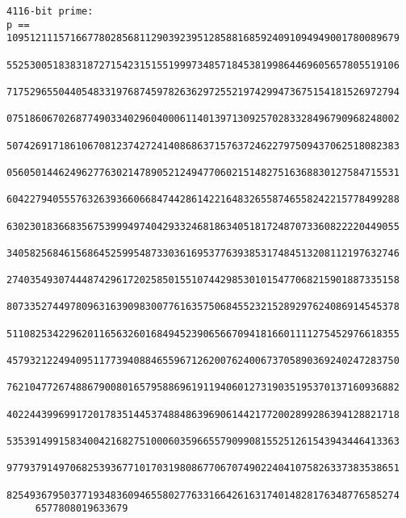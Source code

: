 \documentclass[]{article}
\begin{document}
\begin{small}
\begin{verbatim}
4116-bit prime:
p == 10951211157166778028568112903923951285881685924091094949001780089679
     55253005183831872715423151551999734857184538199864469605657805519106
     71752965504405483319768745978263629725521974299473675154181526972794
     07518606702687749033402960400061140139713092570283328496790968248002
     50742691718610670812374272414086863715763724622797509437062518082383
     05605014462496277630214789052124947706021514827516368830127584715531
     60422794055576326393660668474428614221648326558746558242215778499288
     63023018366835675399949740429332468186340518172487073360822220449055
     34058256846156864525995487330361695377639385317484513208112197632746
     27403549307444874296172025850155107442985301015477068215901887335158
     80733527449780963163909830077616357506845523215289297624086914545378
     51108253422962011656326016849452390656670941816601111275452976618355
     45793212249409511773940884655967126200762400673705890369240247283750
     76210477267488679008016579588696191194060127319035195370137160936882
     40224439969917201783514453748848639690614421772002899286394128821718
     53539149915834004216827510006035966557909908155251261543943446413363
     97793791497068253936771017031980867706707490224041075826337383538651
     82549367950377193483609465580277633166426163174014828176348776585274
     6577808019633679
\end{verbatim}
\end{small}


\end{document}
